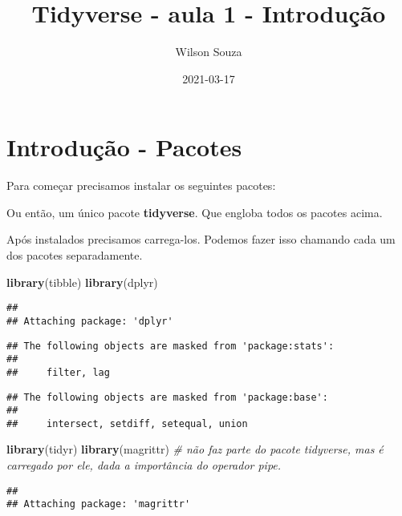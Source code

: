 \documentclass[]{book}
\title{Tidyverse - aula 1 - Introdução}
\author{Wilson Souza}
\date{2021-03-17}
\newenvironment{Shaded}{\begin{snugshade}}{\end{snugshade}}
\newcommand{\CommentTok}[1]{\textcolor[rgb]{0.56,0.35,0.01}{\textit{#1}}}
\newcommand{\KeywordTok}[1]{\textcolor[rgb]{0.13,0.29,0.53}{\textbf{#1}}}
\newcommand{\NormalTok}[1]{#1}
\begin{document}
\maketitle

{
\setcounter{tocdepth}{1}
\tableofcontents
}
\hypertarget{introduuxe7uxe3o---pacotes}{%
\chapter{Introdução - Pacotes}\label{introduuxe7uxe3o---pacotes}}

Para começar precisamos instalar os seguintes pacotes:

Ou então, um único pacote \textbf{tidyverse}. Que engloba todos os pacotes acima.

Após instalados precisamos carrega-los. Podemos fazer isso chamando cada um dos pacotes separadamente.

\begin{Shaded}
\begin{Highlighting}[]
\KeywordTok{library}\NormalTok{(tibble)}
\KeywordTok{library}\NormalTok{(dplyr)}
\end{Highlighting}
\end{Shaded}

\begin{verbatim}
## 
## Attaching package: 'dplyr'
\end{verbatim}

\begin{verbatim}
## The following objects are masked from 'package:stats':
## 
##     filter, lag
\end{verbatim}

\begin{verbatim}
## The following objects are masked from 'package:base':
## 
##     intersect, setdiff, setequal, union
\end{verbatim}

\begin{Shaded}
\begin{Highlighting}[]
\KeywordTok{library}\NormalTok{(tidyr)}
\KeywordTok{library}\NormalTok{(magrittr) }\CommentTok{# não faz parte do pacote tidyverse, mas é carregado por ele, dada a importância do operador pipe.}
\end{Highlighting}
\end{Shaded}

\begin{verbatim}
## 
## Attaching package: 'magrittr'
\end{verbatim}
\end{document}
